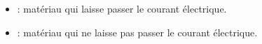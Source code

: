 \begin{mydefs}
	\begin{itemize}
		\item {} : matériau qui laisse passer le courant électrique.
		
		\item {} :  matériau qui ne laisse pas passer le courant électrique.
	\end{itemize}


\end{mydefs}